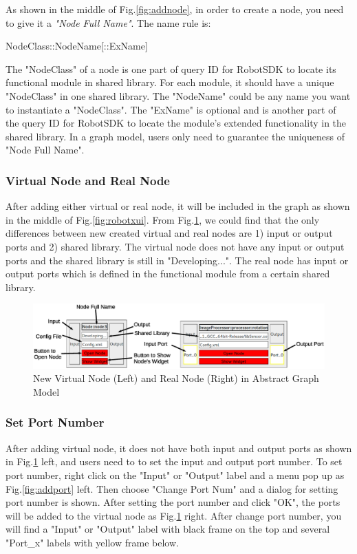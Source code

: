 \documentclass[a4paper,10pt]{book}
\begin{document}
As shown in the middle of Fig.\ref{fig:addnode}, in order to create a node, you need to give it a {\em{"Node Full Name"}}. The name rule is: 

\begin{framed}
\centering
NodeClass::NodeName[::ExName]
\end{framed}

The "NodeClass" of a node is one part of query ID for RobotSDK to locate its functional module in shared library. For each module, it should have a unique "NodeClass" in one shared library. The "NodeName" could be any name you want to instantiate a "NodeClass". The "ExName" is optional and is another part of the query ID for RobotSDK to locate the module's extended functionality in the shared library. In a graph model, users only need to guarantee the uniqueness of "Node Full Name".

\subsubsection{Virtual Node and Real Node}

After adding either virtual or real node, it will be included in the graph as shown in the middle of Fig.\ref{fig:robotxui}. From Fig.\ref{fig:node}, we could find that the only differences between new created virtual and real nodes are 1) input or output ports and 2) shared library. The virtual node does not have any input or output ports and the shared library is still in "Developing...". The real node has input or output ports which is defined in the functional module from a certain shared library.

\begin{figure}
 \centering
 \includegraphics[width=1.0\textwidth]{img/node.eps}
 \caption{New Virtual Node (Left) and Real Node (Right) in Abstract Graph Model}
 \label{fig:node}
\end{figure}

\subsubsection{Set Port Number}

After adding virtual node, it does not have both input and output ports as shown in Fig.\ref{fig:node} left, and users need to to set the input and output port number. To set port number, right click on the "Input" or "Output" label and a menu pop up as Fig.\ref{fig:addport} left. Then choose "Change Port Num" and a dialog for setting port number is shown. After setting the port number and click "OK", the ports will be added to the virtual node as Fig.\ref{fig:node} right. After change port number, you will find a "Input" or "Output" label with black frame on the top and several "Port\_x" labels with yellow frame below.
\end{document}
